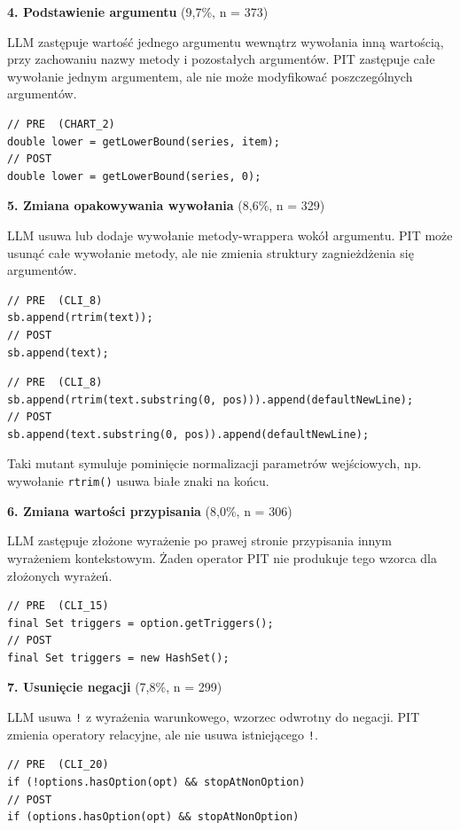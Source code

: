 \documentclass[12pt,a4paper,oldfontcommands]{memoir}
\theoremstyle{plain}
\theoremstyle{definition}
\theoremstyle{remark}
\begin{document}
    \textbf{4. Podstawienie argumentu} (9,7\%, n = 373)

    LLM zastępuje wartość jednego argumentu wewnątrz wywołania inną wartością, przy zachowaniu nazwy metody i pozostałych argumentów.
    PIT zastępuje całe wywołanie jednym argumentem, ale nie może modyfikować poszczególnych argumentów.

    \begin{lstlisting}
// PRE  (CHART_2)
double lower = getLowerBound(series, item);
// POST
double lower = getLowerBound(series, 0);
    \end{lstlisting}

    \textbf{5. Zmiana opakowywania wywołania} (8,6\%, n = 329)

    LLM usuwa lub dodaje wywołanie metody-wrappera wokół argumentu.
    PIT może usunąć całe wywołanie metody, ale nie zmienia struktury zagnieżdżenia się argumentów.

    \begin{lstlisting}
// PRE  (CLI_8)
sb.append(rtrim(text));
// POST
sb.append(text);
    \end{lstlisting}

    \begin{lstlisting}
// PRE  (CLI_8)
sb.append(rtrim(text.substring(0, pos))).append(defaultNewLine);
// POST
sb.append(text.substring(0, pos)).append(defaultNewLine);
    \end{lstlisting}

    Taki mutant symuluje pominięcie normalizacji parametrów wejściowych, np. wywołanie \texttt{rtrim()} usuwa białe znaki na końcu.

    \textbf{6. Zmiana wartości przypisania} (8,0\%, n = 306)

    LLM zastępuje złożone wyrażenie po prawej stronie przypisania innym wyrażeniem kontekstowym.
    Żaden operator PIT nie produkuje tego wzorca dla złożonych wyrażeń.

    \begin{lstlisting}
// PRE  (CLI_15)
final Set triggers = option.getTriggers();
// POST
final Set triggers = new HashSet();
    \end{lstlisting}

    \textbf{7. Usunięcie negacji} (7,8\%, n = 299)

    LLM usuwa \texttt{!} z wyrażenia warunkowego, wzorzec odwrotny do negacji.
    PIT zmienia operatory relacyjne, ale nie usuwa istniejącego \texttt{!}.

    \begin{lstlisting}
// PRE  (CLI_20)
if (!options.hasOption(opt) && stopAtNonOption)
// POST
if (options.hasOption(opt) && stopAtNonOption)
    \end{lstlisting}
\end{document}
